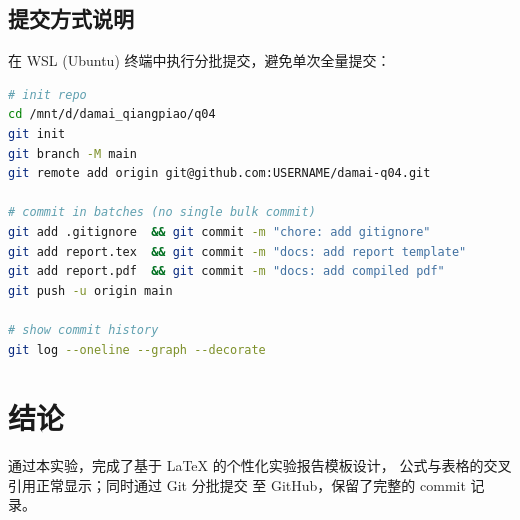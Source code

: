 \documentclass[a4paper,11pt]{ctexart}
\begin{document}
\subsection{提交方式说明}

在 WSL (Ubuntu) 终端中执行分批提交，避免单次全量提交：

\begin{lstlisting}[language=bash]
# init repo
cd /mnt/d/damai_qiangpiao/q04
git init
git branch -M main
git remote add origin git@github.com:USERNAME/damai-q04.git

# commit in batches (no single bulk commit)
git add .gitignore  && git commit -m "chore: add gitignore"
git add report.tex  && git commit -m "docs: add report template"
git add report.pdf  && git commit -m "docs: add compiled pdf"
git push -u origin main

# show commit history
git log --oneline --graph --decorate
\end{lstlisting}

\section{结论}

通过本实验，完成了基于 \LaTeX{} 的个性化实验报告模板设计，
公式与表格的交叉引用正常显示；同时通过 Git 分批提交
至 GitHub，保留了完整的 commit 记录。
\end{document}
